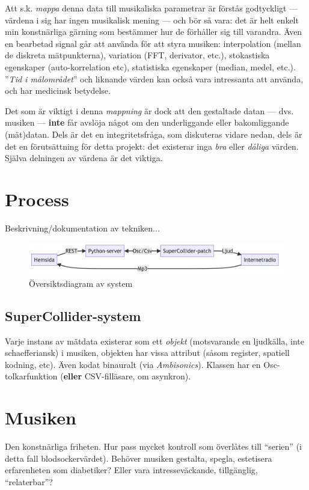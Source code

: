 \documentclass[11pt, twoside, a4paper]{article}
\begin{document}
Att s.k. \emph{mappa} denna data till musikaliska parametrar är förstås godtyckligt --- värdena i sig har ingen musikalisk mening --- och bör så vara: det är helt enkelt min konstnärliga gärning som bestämmer hur de förhåller sig till varandra. Även en bearbetad signal går att använda för att styra musiken: interpolation (mellan de diskreta mätpunkterna), variation (FFT, derivator, etc.), stokastiska egenskaper (auto-korrelation etc), statistiska egenskaper (median, medel, etc.). ''\emph{Tid i målområdet}'' och liknande värden kan också vara intressanta att använda, och har medicinsk betydelse.

Det som är viktigt i denna \emph{mappning} är dock att den gestaltade datan --- dvs. musiken --- \textbf{inte} får avslöja något om den underliggande eller bakomliggande (mät)datan. Dels är det en integritetsfråga, som diskuteras vidare nedan, dels är det en förutsättning för detta projekt: det existerar inga \emph{bra} eller \emph{dåliga} värden. Själva delningen av värdena är det viktiga.


\section{Process}
Beskrivning/dokumentation av tekniken...

\begin{figure}[h!]
\centering
\includegraphics[width=\textwidth]{../media/flowchart.png}
\caption{Översiktsdiagram av system}
\end{figure}

\subsection{SuperCollider-system}
Varje instans av mätdata existerar som ett \emph{objekt} (motsvarande en ljudkälla, inte schaefferiansk) i musiken, objekten har vissa attribut (såsom register, spatiell kodning, etc). Även kodat binauralt (via \emph{Ambisonics}). Klassen har en Osc-tolkarfunktion (\textbf{eller} CSV-filläsare, om asynkron).

\section{Musiken}
Den konstnärliga friheten. Hur pass mycket kontroll som överlåtes till \enquote{serien} (i detta fall blodsockervärdet). Behöver musiken gestalta, spegla, estetisera erfarenheten som diabetiker? Eller vara intresseväckande, tillgänglig, \enquote{relaterbar}? 
\end{document}
